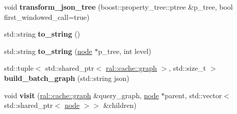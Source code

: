 \begin{DoxyCompactItemize}
void {\bfseries transform\+\_\+json\+\_\+tree} (boost\+::property\+\_\+tree\+::ptree \&p\+\_\+tree, bool first\+\_\+windowed\+\_\+call=true)
\item 
\mbox{\label{structral_1_1batch_1_1tree__processor_a1e6fd084fd75a1f9ff90c248fd54558f}} 
std\+::string {\bfseries to\+\_\+string} ()
\item 
\mbox{\label{structral_1_1batch_1_1tree__processor_aafdf123aeee84d5d0b3d6d7be4c0f341}} 
std\+::string {\bfseries to\+\_\+string} (\hyperlink{structral_1_1batch_1_1node}{node} $\ast$p\+\_\+tree, int level)
\item 
\mbox{\label{structral_1_1batch_1_1tree__processor_a7e8b1c6d1e558b7df3b63e01174d60dc}} 
std\+::tuple$<$ std\+::shared\+\_\+ptr$<$ \hyperlink{classral_1_1cache_1_1graph}{ral\+::cache\+::graph} $>$, std\+::size\+\_\+t $>$ {\bfseries build\+\_\+batch\+\_\+graph} (std\+::string json)
\item 
\mbox{\label{structral_1_1batch_1_1tree__processor_a9f0f7e5089826076cb1bdfa30083ddcd}} 
void {\bfseries visit} (\hyperlink{classral_1_1cache_1_1graph}{ral\+::cache\+::graph} \&query\+\_\+graph, \hyperlink{structral_1_1batch_1_1node}{node} $\ast$parent, std\+::vector$<$ std\+::shared\+\_\+ptr$<$ \hyperlink{structral_1_1batch_1_1node}{node} $>$$>$ \&children)
\end{DoxyCompactItemize}
